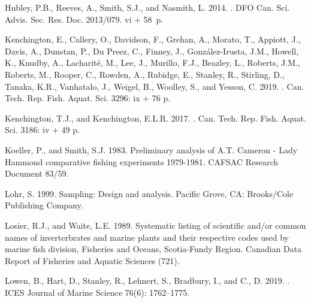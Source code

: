 \documentclass[12pt]{article}\usepackage[]{graphicx}\usepackage[]{color}
\begin{document}
\begin{CSLReferences}{1}{0}
\leavevmode\hypertarget{ref-Hubley2013}{}%
Hubley, P.B., Reeves, A., Smith, S.J., and Nasmith, L. 2014. . DFO Can. Sci. Advis. Sec. Res. Doc. 2013/079. vi + 58~p.

\leavevmode\hypertarget{ref-Kenchington2019}{}%
Kenchington, E., Callery, O., Davidson, F., Grehan, A., Morato, T., Appiott, J., Davis, A., Dunstan, P., Du Preez, C., Finney, J., González-Irusta, J.M., Howell, K., Knudby, A., Lacharité, M., Lee, J., Murillo, F.J., Beazley, L., Roberts, J.M., Roberts, M., Rooper, C., Rowden, A., Rubidge, E., Stanley, R., Stirling, D., Tanaka, K.R., Vanhatalo, J., Weigel, B., Woolley, S., and Yesson, C. 2019. . Can. Tech. Rep. Fish. Aquat. Sci. 3296: ix + 76 p.

\leavevmode\hypertarget{ref-Kenchingtons2013}{}%
Kenchington, T.J., and Kenchington, E.L.R. 2017. . Can. Tech. Rep. Fish. Aquat. Sci. 3186: iv + 49 p.

\leavevmode\hypertarget{ref-Koeller-Smith-1983}{}%
Koeller, P., and Smith, S.J. 1983. Preliminary analysis of {A.T.} {C}ameron - {L}ady {H}ammond comparative fishing experiments 1979-1981. CAFSAC Research Document 83/59.

\leavevmode\hypertarget{ref-Lohr1999}{}%
Lohr, S. 1999. Sampling: Design and analysis. Pacific Grove, CA: Brooks/Cole Publishing Company.

\leavevmode\hypertarget{ref-LosierWaite1989}{}%
Losier, R.J., and Waite, L.E. 1989. Systematic listing of scientific and/or common names of inverterbrates and marine plants and their respective codes used by marine fish division, {F}isheries and {O}ceans, {S}cotia-{F}undy {R}egion. Canadian Data Report of Fisheries and Aquatic Sciences (721).

\leavevmode\hypertarget{ref-Lowen:2019}{}%
Lowen, B., Hart, D., Stanley, R., Lehnert, S., Bradbury, I., and C., D. 2019. . ICES Journal of Marine Science 76(6): 1762--1775.


\end{CSLReferences}
\end{document}
